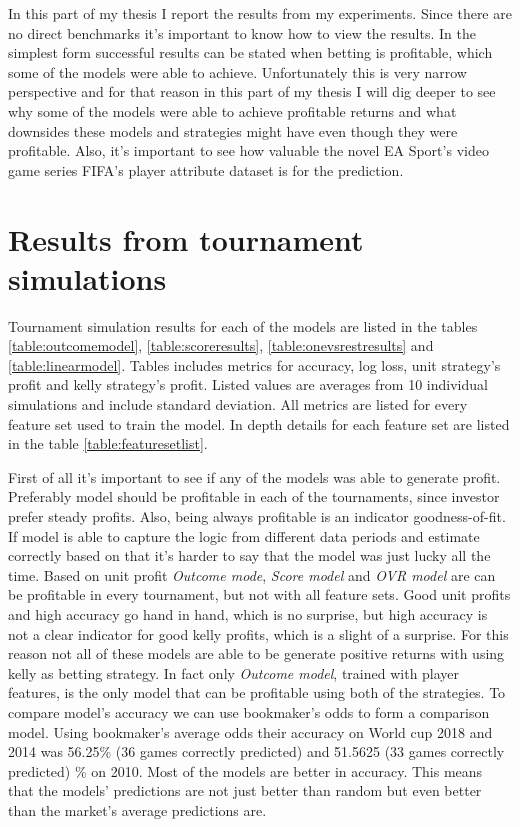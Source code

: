In this part of my thesis I report the results from my experiments. Since there are no direct benchmarks it's important to know how to view the results. In the simplest form successful results can be stated when betting is profitable, which some of the models were able to achieve. Unfortunately this is very narrow perspective and for that reason in this part of my thesis I will dig deeper to see why some of the models were able to achieve profitable returns and what downsides these models and strategies might have even though they were profitable. Also, it's important to see how valuable the novel EA Sport's video game series FIFA's player attribute dataset is for the prediction.

\section{Results from tournament simulations}
Tournament simulation results for each of the models are listed in the tables \ref{table:outcomemodel}, \ref{table:scoreresults}, \ref{table:onevsrestresults} and \ref{table:linearmodel}. Tables includes metrics for accuracy, log loss, unit strategy's profit and kelly strategy's profit. Listed values are averages from 10 individual simulations and include standard deviation. All metrics are listed for every feature set used to train the model. In depth details for each feature set are listed in the table \ref{table:featuresetlist}.

First of all it's important to see if any of the models was able to generate profit. Preferably model should be profitable in each of the tournaments, since investor prefer steady profits. Also, being always profitable is an indicator goodness-of-fit. If model is able to capture the logic from different data periods and estimate correctly based on that it's harder to say that the model was just lucky all the time. Based on unit profit \textit{Outcome mode}, \textit{Score model} and \textit{OVR model} are can be profitable in every tournament, but not with all feature sets.  Good unit profits and high accuracy go hand in hand, which is no surprise, but high accuracy is not a clear indicator for good kelly profits, which is a slight of a surprise. For this reason not all of these models are able to be generate positive returns with using kelly as betting strategy. In fact only \textit{Outcome model}, trained with player features, is the only model that can be profitable using both of the strategies. To compare model's accuracy we can use bookmaker's odds to form a comparison model. Using bookmaker's average odds their accuracy on World cup 2018 and 2014 was 56.25\% (36 games correctly predicted) and 51.5625 (33 games correctly predicted) \% on 2010. Most of the models are better in accuracy. This means that the models' predictions are not just better than random but even better than the market's average predictions are.

